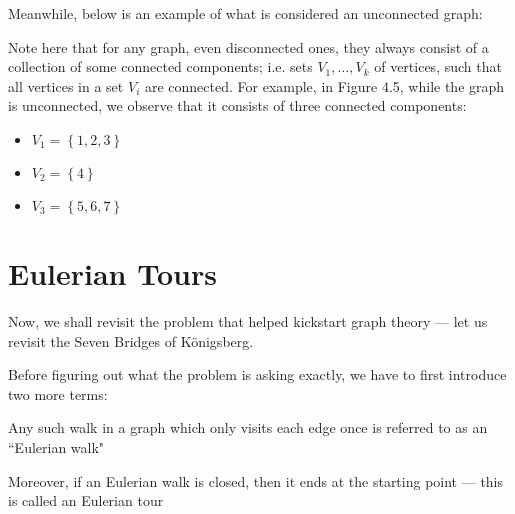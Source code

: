 \documentclass[openany]{book}
\begin{document}
\begin{example}
	Meanwhile, below is an example of what is considered an unconnected graph:
	\begin{center}
	\end{center}
	
	Note here that for any graph, even disconnected ones, they always consist of a collection of some connected components; i.e. sets $V_{1}, \ldots, V_{k}$ of vertices, such that all vertices in a set $V_{i}$ are connected. For example, in Figure 4.5, while the graph is unconnected, we observe that it consists of three connected components:
	\begin{itemize}
		\item $V_{1} = \left\{  1,2,3 \right\}$
		\item $V_{2} = \left\{  4 \right\}$
		\item $V_{3} = \left\{  5, 6, 7 \right\}$
	\end{itemize}
\end{example}

\section{Eulerian Tours}
Now, we shall revisit the problem that helped kickstart graph theory --- let us revisit the Seven Bridges of K\"{o}nigsberg.

Before figuring out what the problem is asking exactly, we have to first introduce two more terms:
\begin{defn}
	Any such walk in a graph which only visits each edge once is referred to as an ``Eulerian walk" 
\end{defn} 
\begin{defn}
	Moreover, if an Eulerian walk is closed, then it ends at the starting point --- this is called an Eulerian tour 
\end{defn}
\end{document}
